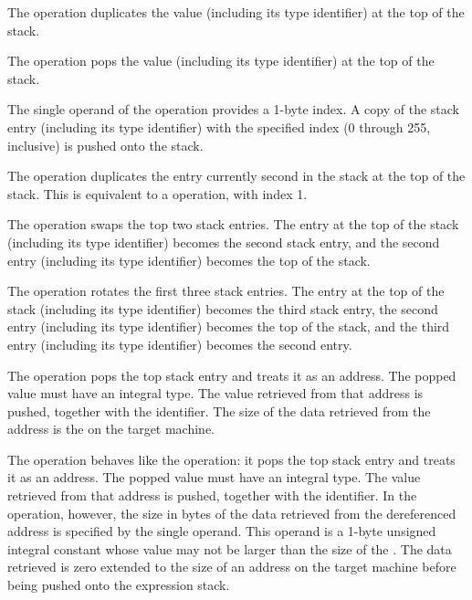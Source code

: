 \begin{enumerate}[1. ]
\itembfnl{\DWOPdupTARG}
The \DWOPdupNAME{} operation duplicates the value (including its 
type identifier) at the top of the stack.

\itembfnl{\DWOPdropTARG}
The \DWOPdropNAME{} operation pops the value (including its type 
identifier) at the top of the stack.

\itembfnl{\DWOPpickTARG}
The single operand of the \DWOPpickNAME{} operation provides a
1-byte index. A copy of the stack entry (including its 
type identifier) with the specified
index (0 through 255, inclusive) is pushed onto the stack.

\itembfnl{\DWOPoverTARG}
The \DWOPoverNAME{} operation duplicates the entry currently second
in the stack at the top of the stack. 
This is equivalent to a
\DWOPpick{} operation, with index 1.  

\itembfnl{\DWOPswapTARG}
The \DWOPswapNAME{} operation swaps the top two stack entries. 
The entry at the top of the stack (including its type identifier)
becomes the second stack entry, and the second entry (including 
its type identifier) becomes the top of the stack.

\itembfnl{\DWOProtTARG}
The \DWOProtNAME{} operation rotates the first three stack
entries. The entry at the top of the stack (including its 
type identifier) becomes the third stack entry, the second 
entry (including its type identifier) becomes the top of 
the stack, and the third entry (including its type identifier)
becomes the second entry.

\itembfnl{\DWOPderefTARG}
The \DWOPderefNAME{} operation pops the top stack entry and 
treats it as an address. The popped value must have an integral type.
The value retrieved from that address is pushed, together with the
\specialaddresstype{} identifier. 
The size of the data retrieved from the 
address is the  on the target machine.

\itembfnl{\DWOPderefsizeTARG}
The \DWOPderefsizeNAME{} operation behaves like the 
\DWOPderef{}
operation: it pops the top stack entry and treats it as an
address. The popped value must have an integral type.
The value retrieved from that address is pushed, together with the
\specialaddresstype{} identifier. In
the \DWOPderefsizeNAME{} operation, however, the size in bytes
of the data retrieved from the dereferenced address is
specified by the single operand. This operand is a 1-byte
unsigned integral constant whose value may not be larger
than the size of the \specialaddresstype. The data
retrieved is zero extended to the size of an address on the
target machine before being pushed onto the expression stack.


\end{enumerate}
